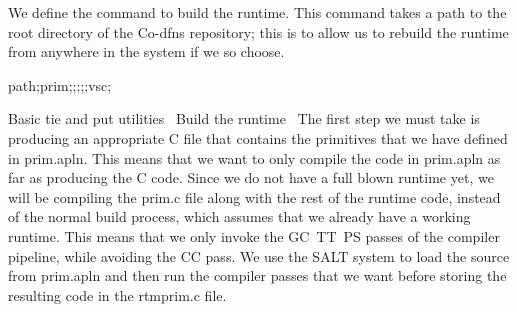 \documentclass{article}%
\begin{document}
We define the command {\Tt{}\nwendquote} to build the runtime.
This command takes a path to the root directory of the Co-dfns
repository; this is to allow us to rebuild the runtime from anywhere
in the system if we so choose.

\nwenddocs{}\endmoddef\nwstartdeflinemarkup\nwenddeflinemarkup
{} path;prim;;;;;vsc;

\LA{}Basic \code{}tie\edoc{} and \code{}put\edoc{} utilities~{\nwtagstyle{}}\RA{}
\LA{}Build the runtime~{\nwtagstyle{}}\RA{}
\eatline
{}\nwendcode{}\nwdocspar
The first step we must take is producing an appropriate C file that
contains the primitives that we have defined in {\Tt{}prim.apln\nwendquote}.
This means that we want to only compile the code in {\Tt{}prim.apln\nwendquote}
as far as producing the C code.
Since we do not have a full blown runtime yet,
we will be compiling the {\Tt{}prim.c\nwendquote} file along with the rest of the
runtime code,
instead of the normal build process,
which assumes that we already have a working runtime.
This means that we only invoke the {\Tt{}GC\ TT\ PS\nwendquote} passes of the
compiler pipeline, while avoiding the {\Tt{}CC\nwendquote} pass.
We use the SALT system to load the source from {\Tt{}prim.apln\nwendquote} and then
run the compiler passes that we want before storing the resulting
code in the {\Tt{}rtm{\nwbackslash}prim.c\nwendquote} file.
\end{document}
